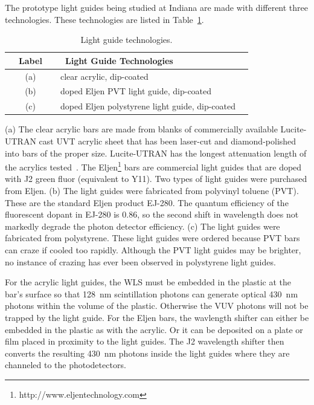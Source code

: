 The prototype light guides being studied at Indiana are made with
different three technologies. These technologies are listed in
Table~\ref{tab:lightGuides}.
\begin{table}[ht]
  \begin{center}
    \caption{Light guide technologies.}
    \label{tab:lightGuides}
    \begin{tabular}{ c l  c }
      \hline
      \hline
      ~~Label~~ & ~Light Guide Technologies~  \\
      \hline
      (a) & clear acrylic, dip-coated  \\
      (b) & doped Eljen PVT light guide, dip-coated  \\
      (c) & doped Eljen polystyrene light guide, dip-coated   \\
      \hline
      \hline
    \end{tabular}
  \end{center}
\end{table}
(a) The clear acrylic bars are made from blanks of commercially
available Lucite-UTRAN cast UVT acrylic sheet that has been laser-cut
and diamond-polished into bars of the proper size.  Lucite-UTRAN has
the longest attenuation length of the acrylics
tested~\cite{bib:mufsonJINST}.  The
Eljen\footnote{http://www.eljentechnology.com} bars are commercial
light guides that are doped with J2 green fluor (equivalent to Y11).
Two types of light guides were purchased from Eljen.  (b) The light
guides were fabricated from polyvinyl toluene (PVT).  These are the
standard Eljen product EJ-280.  The quantum efficiency of the
fluorescent dopant in EJ-280 is 0.86, so the second shift in
wavelength does not markedly degrade the photon detector efficiency.
(c) The light guides were fabricated from polystyrene.  These light
guides were ordered because PVT bars can craze if cooled too rapidly.
Although the PVT light guides may be brighter, no instance of crazing
has ever been observed in polystyrene light guides.

For the acrylic light guides, the WLS must be embedded in the plastic
at the bar's surface so that 128~nm scintillation photons can generate
optical 430~nm photons within the volume of the plastic.  Otherwise
the VUV photons will not be trapped by the light guide.  For the Eljen
bars, the wavlength shifter can either be embedded in the plastic as
with the acrylic.  Or it can be deposited on a plate or film placed in
proximity to the light guides.  The J2 wavelength shifter then
converts the resulting 430~nm photons inside the light guides where
they are channeled to the photodetectors.

